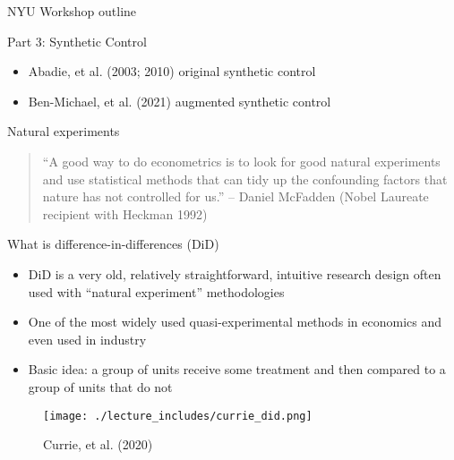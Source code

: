 \documentclass{beamer}
\begin{document}
\begin{frame}{NYU Workshop outline}

Part 3: Synthetic Control 
	\begin{itemize}
	\item Abadie, et al. (2003; 2010) original synthetic control
	\item Ben-Michael, et al. (2021) augmented synthetic control
	\end{itemize}

\end{frame}




\begin{frame}{Natural experiments}

\begin{quote}
``A good way to do econometrics is to look for good natural experiments and use statistical methods that can tidy up the confounding factors that nature has not controlled for us.'' -- Daniel McFadden (Nobel Laureate recipient with Heckman 1992)
\end{quote}

\end{frame}








\begin{frame}{What is difference-in-differences (DiD)}

\begin{itemize}
\item DiD is a very old, relatively straightforward, intuitive research design often used with ``natural experiment'' methodologies
\item One of the most widely used quasi-experimental methods in economics and even used in industry
\item Basic idea: a group of units receive some treatment and then compared to a group of units that do not
\end{itemize}

\end{frame}


\begin{frame}

	\begin{figure}
	\caption{Currie, et al. (2020)}
	\texttt{[image: ./lecture\_includes/currie\_did.png]}
	\end{figure}


\end{frame}
\end{document}
